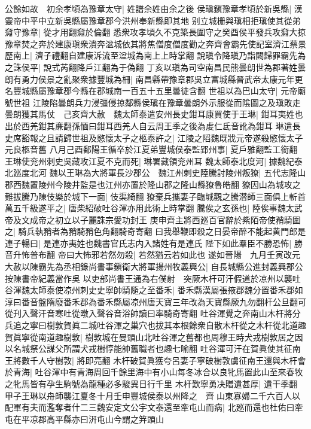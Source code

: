 公餘如故　初余孝頃為豫章太守|{
	姓譜余姓由余之後}
侯瑱鎭豫章孝頃於新吳縣|{
	漢靈帝中平中立新吳縣屬豫章郡今洪州奉新縣即其地}
别立城栅與瑱相拒瑱使其從弟奫守豫章|{
	從才用翻奫於倫翻}
悉衆攻孝頃久不克築長圍守之癸酉侯平發兵攻奫大掠豫章焚之奔於建康瑱衆潰奔湓城依其將焦僧度僧度勸之奔齊會霸先使記室濟江蔡景歷南上|{
	濟子禮翻自建康泝流至湓城為南上上時掌翻}
說瑱令降瑱乃詣闕歸罪霸先為之誅侯平|{
	說式芮翻降戶江翻為于偽翻}
丁亥以瑱為司空南昌民熊曇朗世為郡著姓曇朗有勇力侯景之亂聚衆據豐城為柵|{
	南昌縣帶豫章郡吳立富城縣晉武帝太康元年更名豐城縣屬豫章郡今縣在郡城南一百五十五里曇徒含翻}
世祖以為巴山太守|{
	元帝廟號世祖}
江陵陷曇朗兵力浸彊侵掠鄰縣侯瑱在豫章曇朗外示服從而隂圖之及瑱敗走曇朗獲其馬仗　己亥齊大赦　魏太師泰遣安州長史鉗耳康買使于王琳|{
	鉗耳夷姓也出於西羌鉗其亷翻孫愐曰鉗耳西羌人自云周王季之後為䖍仁氐音訛為鉗耳}
琳遣長史席豁報之且請歸世祖及愍懷太子之柩泰許之|{
	江陵之䧟魏既戕元帝遂殺愍懷太子元良柩音舊}
八月己酉鄱陽王循卒於江夏弟豐城侯泰監郢州事|{
	夏戶雅翻監工銜翻}
王琳使兖州刺史吳藏攻江夏不克而死|{
	琳署藏領兖州耳}
魏太師泰北度河|{
	據魏紀泰北廵度北河}
魏以王琳為大將軍長沙郡公　魏江州刺史陸騰討陵州叛獠|{
	五代志隆山郡西魏置陵州今陵井監是也江州亦置於隆山郡之隆山縣獠魯皓翻}
獠因山為城攻之難拔騰乃陳伎樂於城下一面|{
	伎渠綺翻}
獠棄兵攜妻子臨城觀之騰潜師三面俱上斬首萬五千級遂平之|{
	唐柴紹破吐谷渾亦用此術上時掌翻}
騰俟之玄孫也|{
	陸俟事魏太武帝及文成帝之初立以子麗誅宗愛功封王}
庚申齊主將西廵百官辭於紫陌帝使矟騎圍之|{
	騎兵執矟者為矟騎矟色角翻騎奇寄翻}
曰我舉鞭即殺之日晏帝醉不能起黄門郎是連子暢曰|{
	是連亦夷姓也魏書官氏志内入諸姓有是連氏}
陛下如此羣臣不勝恐怖|{
	勝音升怖普布翻}
帝曰大怖邪若然勿殺|{
	若然猶云若如此也}
遂如晉陽　九月壬寅改元大赦以陳霸先為丞相錄尚書事鎭衛大將軍揚州牧義興公|{
	自長城縣公進封義興郡公按陳書帝紀義當作吳}
以吏部尚書王通為右僕射　突厥木杆可汗假道於凉州以襲吐谷渾魏太師泰使凉州刺史史寧帥騎隨之至番禾|{
	番禾縣漢屬張掖郡魏分置番禾郡如淳曰番音盤隋廢番禾郡為番禾縣屬凉州唐天寶三年改為天寶縣厥九勿翻杆公旦翻可從刋入聲汗音寒吐從暾入聲谷音浴帥讀曰率騎奇寄翻}
吐谷渾覺之奔南山木杆將分兵追之寧曰樹敦賀眞二城吐谷渾之巢穴也拔其本根餘衆自散木杆從之木杆從北道趣賀眞寧從南道趣樹敦|{
	樹敦城在曼頭山北吐谷渾之舊都也周穆王時犬戎樹敦居之因以名城祭公謀父所謂犬戎樹惇能帥舊職者也趣七喻翻}
吐谷渾可汗在賀眞使其征南王將數千人守樹敦|{
	將即亮翻}
木杆破賀眞獲夸呂妻子寧破樹敦虜征南王還與木杆會於青海|{
	吐谷渾中有青海周回千餘里海中有小山每冬冰合以良牝馬置此山至來春牧之牝馬皆有孕生駒號為龍種必多駿異日行千里}
木杆歎寧勇决贈遺甚厚|{
	遺干季翻}
甲子王琳以舟師襲江夏冬十月壬申豐城侯泰以州降之　齊山東寡婦二千六百人以配軍有夫而濫奪者什二三魏安定文公宇文泰還至牽屯山而病|{
	北廵而還也杜佑曰牽屯在平凉郡高平縣亦曰汧屯山今謂之笄頭山}
